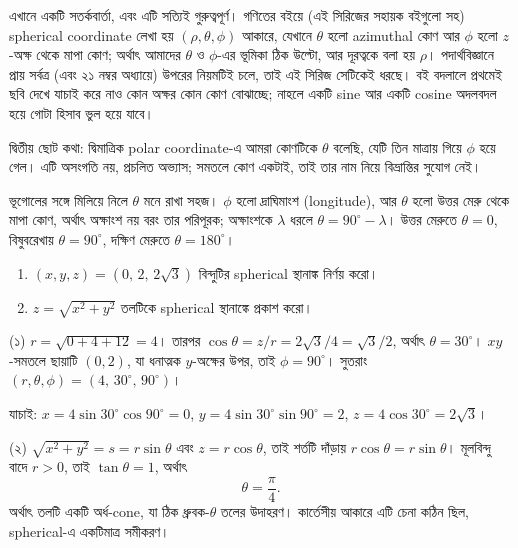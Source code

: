 \documentclass[11pt]{article}
\begin{document}
\begin{remark}
এখানে একটি সতর্কবার্তা, এবং এটি সত্যিই গুরুত্বপূর্ণ। গণিতের বইয়ে (এই সিরিজের
সহায়ক বইগুলো সহ) spherical coordinate লেখা হয় $(\rho, \theta, \phi)$ আকারে,
যেখানে $\theta$ হলো azimuthal কোণ আর $\phi$ হলো $z$-অক্ষ থেকে মাপা কোণ; অর্থাৎ
আমাদের $\theta$ ও $\phi$-এর ভূমিকা ঠিক উল্টো, আর দূরত্বকে বলা হয় $\rho$।
পদার্থবিজ্ঞানে প্রায় সর্বত্র (এবং ২১ নম্বর অধ্যায়ে) উপরের নিয়মটিই চলে, তাই
এই সিরিজ সেটিকেই ধরছে। বই বদলালে প্রথমেই ছবি দেখে যাচাই করে নাও কোন অক্ষর কোন
কোণ বোঝাচ্ছে; নাহলে একটি sine আর একটি cosine অদলবদল হয়ে গোটা হিসাব ভুল হয়ে
যাবে।

দ্বিতীয় ছোট কথা: দ্বিমাত্রিক polar coordinate-এ আমরা কোণটিকে $\theta$ বলেছি,
যেটি তিন মাত্রায় গিয়ে $\phi$ হয়ে গেল। এটি অসংগতি নয়, প্রচলিত অভ্যাস; সমতলে
কোণ একটাই, তাই তার নাম নিয়ে বিভ্রান্তির সুযোগ নেই।
\end{remark}

\begin{remark}
ভূগোলের সঙ্গে মিলিয়ে নিলে $\theta$ মনে রাখা সহজ। $\phi$ হলো দ্রাঘিমাংশ
(longitude), আর $\theta$ হলো উত্তর মেরু থেকে মাপা কোণ, অর্থাৎ অক্ষাংশ নয়
বরং তার পরিপূরক; অক্ষাংশকে $\lambda$ ধরলে $\theta = 90^{\circ} - \lambda$। উত্তর মেরুতে
$\theta = 0$, বিষুবরেখায় $\theta = 90^{\circ}$, দক্ষিণ মেরুতে
$\theta = 180^{\circ}$।
\end{remark}

\begin{example}
\begin{enumerate}
  \item $(x,y,z) = \left( 0,\, 2,\, 2\sqrt{3} \right)$ বিন্দুটির spherical
        স্থানাঙ্ক নির্ণয় করো।
  \item $z = \sqrt{x^{2}+y^{2}}$ তলটিকে spherical স্থানাঙ্কে প্রকাশ করো।
\end{enumerate}
\end{example}

\begin{solbox}
(১) $r = \sqrt{0 + 4 + 12} = 4$। তারপর
$\cos\theta = z/r = 2\sqrt{3}/4 = \sqrt{3}/2$, অর্থাৎ $\theta = 30^{\circ}$।
$xy$-সমতলে ছায়াটি $(0,2)$, যা ধনাত্মক $y$-অক্ষের উপর, তাই
$\phi = 90^{\circ}$। সুতরাং $(r,\theta,\phi) = (4,\, 30^{\circ},\, 90^{\circ})$।

যাচাই: $x = 4\sin 30^{\circ}\cos 90^{\circ} = 0$,
$y = 4\sin 30^{\circ}\sin 90^{\circ} = 2$,
$z = 4\cos 30^{\circ} = 2\sqrt{3}$।

(২) $\sqrt{x^{2}+y^{2}} = s = r\sin\theta$ এবং $z = r\cos\theta$, তাই শর্তটি
দাঁড়ায় $r\cos\theta = r\sin\theta$। মূলবিন্দু বাদে $r > 0$, তাই
$\tan\theta = 1$, অর্থাৎ
\[
  \theta = \frac{\pi}{4} .
\]
অর্থাৎ তলটি একটি অর্ধ-cone, যা ঠিক ধ্রুবক-$\theta$ তলের উদাহরণ। কার্তেসীয়
আকারে এটি চেনা কঠিন ছিল, spherical-এ একটিমাত্র সমীকরণ।
\end{solbox}
\end{document}
